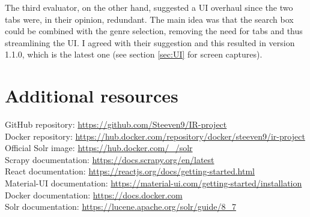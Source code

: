 \documentclass[12pt]{article}
\begin{document}
	The third evaluator, on the other hand, suggested a UI overhaul since the two tabs were, in their opinion, redundant. The main idea was that the search box could be combined with the genre selection, removing the need for tabs and thus streamlining the UI. I agreed with their suggestion and this resulted in version 1.1.0, which is the latest one (see section \ref{sec:UI} for screen captures).\\
	
	
\section{Additional resources}

	GitHub repository: \url{https://github.com/Steeven9/IR-project}\\
	
	Docker repository: \url{https://hub.docker.com/repository/docker/steeven9/ir-project}\\
	
	Official Solr image: \url{https://hub.docker.com/_/solr}\\
	
	Scrapy documentation: \url{https://docs.scrapy.org/en/latest}\\
	
	React documentation: \url{https://reactjs.org/docs/getting-started.html}\\
	
	Material-UI documentation: \url{https://material-ui.com/getting-started/installation}\\
	
	Docker documentation: \url{https://docs.docker.com}\\
	
	Solr documentation: \url{https://lucene.apache.org/solr/guide/8_7}
	
\end{document}
